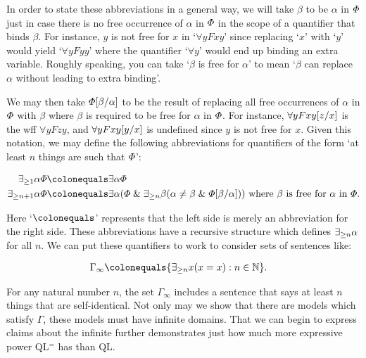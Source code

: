 In order to state these abbreviations in a general way, we will take $\beta$ to be  $\alpha$ in $\varPhi$ just in case there is no free occurrence of $\alpha$ in $\varPhi$ in the scope of a quantifier that binds $\beta$. 
For instance, $y$ is not free for $x$ in `$\forall y Fxy$' since replacing `$x$' with `$y$' would yield `$\forall yFyy$' where the quantifier `$\forall y$' would end up binding an extra variable.
Roughly speaking, you can take `$\beta$ is free for $\alpha$' to mean `$\beta$ can replace $\alpha$ without leading to extra binding'.

We may then take $\varPhi[\beta/\alpha]$ to be the result of replacing all free occurrences of $\alpha$ in $\varPhi$ with $\beta$ where $\beta$ is required to be free for $\alpha$ in $\varPhi$. 
For instance, $\forall yFxy[z/x]$ is the wff $\forall yFzy$, and $\forall yFxy[y/x]$ is undefined since $y$ is not free for $x$.
Given this notation, we may define the following abbreviations for quantifiers of the form `at least $n$ things are such that $\varPhi$':

\vspace{-.2in}
\begin{align*}
  \qt{\exists_{\geq 1}}{\alpha}\metaA &\colonequals \qt{\exists}{\alpha}\metaA\\ 
  \qt{\exists_{\geq n+1}}{\alpha}\metaA &\colonequals \qt{\exists}{\alpha}(\metaA \eand \qt{\exists_{\geq n}}{\beta}(\alpha \neq \beta \eand \metaA\unisub{\beta}{\alpha})) \text{ where } \beta \text{ is free for } \alpha \text{ in } \metaA.
\end{align*}
\vspace{-.2in}

Here `$\colonequals$' represents that the left side is merely an abbreviation for the right side. 
These abbreviations have a recursive structure which defines $\exists_{\geq n} \alpha$ for all $n$.
We can put these quantifiers to work to consider sets of sentences like:

\vspace{-.2in}
\begin{align*}
  \Gamma_{\infty} &\colonequals \set{\qt{\exists_{\geq n}}{x}(x=x): n\in\mathbb{N}}.
\end{align*}
\vspace{-.2in}

For any natural number $n$, the set $\Gamma_\infty$ includes a sentence that says at least $n$ things that are self-identical.
Not only may we show that there are models which satisfy $\Gamma$, these models must have infinite domains.
That we can begin to express claims about the infinite further demonstrates just how much more expressive power QL$^=$ has than QL. 

